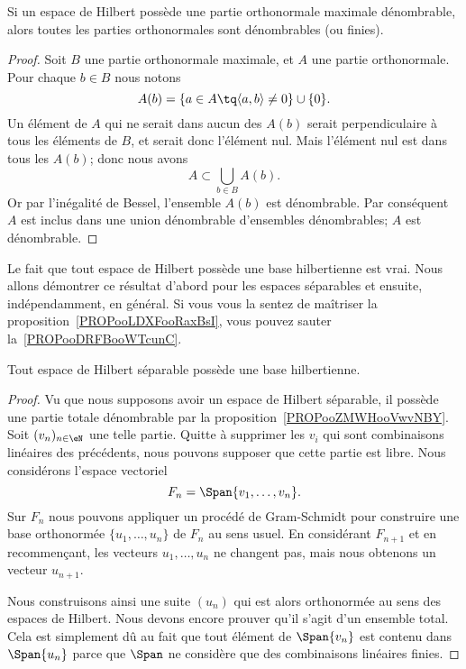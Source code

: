 \begin{proposition}      \label{PROPooENTIooIplRAS}
    Si un espace de Hilbert possède une partie orthonormale maximale dénombrable, alors toutes les parties orthonormales sont dénombrables (ou finies).
\end{proposition}

\begin{proof}
    Soit \( B\) une partie orthonormale maximale, et \( A\) une partie orthonormale. Pour chaque \( b\in B\) nous notons
    \begin{equation}
        A(b)=\{ a\in A\tq \langle a, b\rangle \neq 0 \}\cup\{ 0 \}.
    \end{equation}
    Un élément de \( A\) qui ne serait dans aucun des \( A(b)\) serait perpendiculaire à tous les éléments de \( B\), et serait donc l'élément nul. Mais l'élément nul est dans tous les \( A(b)\); donc nous avons
    \begin{equation}
        A\subset\bigcup_{b\in B}A(b).
    \end{equation}
    Or par l'inégalité de Bessel, l'ensemble \( A(b)\) est dénombrable. Par conséquent \( A\) est inclus dans une union dénombrable d'ensembles dénombrables; \( A\) est dénombrable.
\end{proof}

Le fait que tout espace de Hilbert possède une base hilbertienne est vrai. Nous allons démontrer ce résultat d'abord pour les espaces séparables et ensuite, indépendamment, en général. Si vous vous la sentez de maîtriser la proposition~\ref{PROPooLDXFooRaxBsI}, vous pouvez sauter la~\ref{PROPooDRFBooWTcunC}.
\begin{proposition}     \label{PROPooDRFBooWTcunC}
    Tout espace de Hilbert séparable possède une base hilbertienne.
\end{proposition}

\begin{proof}
    Vu que nous supposons avoir un espace de Hilbert séparable, il possède une partie totale dénombrable par la proposition~\ref{PROPooZMWHooVwvNBY}. Soit  \( (v_n)_{n\in \eN}\) une telle partie. Quitte à supprimer les \( v_i\) qui sont combinaisons linéaires des précédents, nous pouvons supposer que cette partie est libre. Nous considérons l'espace vectoriel
    \begin{equation}
        F_n=\Span\{ v_1,\ldots, v_n \}.
    \end{equation}
    Sur \( F_n\) nous pouvons appliquer un procédé de Gram-Schmidt pour construire une base orthonormée \( \{ u_1,\ldots, u_n \}\) de \( F_n\) au sens usuel. En considérant \( F_{n+1}\) et en recommençant, les vecteurs \( u_1,\ldots, u_n\) ne changent pas, mais nous obtenons un vecteur \( u_{n+1}\).

    Nous construisons ainsi une suite \( (u_n)\) qui est alors orthonormée au sens des espaces de Hilbert. Nous devons encore prouver qu'il s'agit d'un ensemble total. Cela est simplement dû au fait que tout élément de \( \Span\{ v_n \}\) est contenu dans \( \Span\{ u_n \}\) parce que \( \Span\) ne considère que des combinaisons linéaires finies.
\end{proof}

